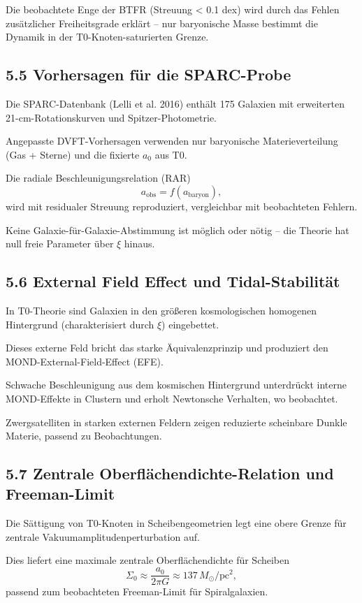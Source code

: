	Die beobachtete Enge der BTFR (Streuung < 0.1 dex) wird durch das Fehlen zusätzlicher Freiheitsgrade erklärt – nur baryonische Masse bestimmt die Dynamik in der T0-Knoten-saturierten Grenze.
	
	\subsection{5.5 Vorhersagen für die SPARC-Probe}
	
	Die SPARC-Datenbank (Lelli et al. 2016) enthält 175 Galaxien mit erweiterten 21-cm-Rotationskurven und Spitzer-Photometrie.
	
	Angepasste DVFT-Vorhersagen verwenden nur baryonische Materieverteilung (Gas + Sterne) und die fixierte $a_0$ aus T0.
	
	Die radiale Beschleunigungsrelation (RAR)
	\[
	a_{\text{obs}} = f(a_{\text{baryon}}),
	\]
	wird mit residualer Streuung reproduziert, vergleichbar mit beobachteten Fehlern.
	
	Keine Galaxie-für-Galaxie-Abstimmung ist möglich oder nötig – die Theorie hat null freie Parameter über $\xi$ hinaus.
	
	\subsection{5.6 External Field Effect und Tidal-Stabilität}
	
	In T0-Theorie sind Galaxien in den größeren kosmologischen homogenen Hintergrund (charakterisiert durch $\xi$) eingebettet.
	
	Dieses externe Feld bricht das starke Äquivalenzprinzip und produziert den MOND-External-Field-Effect (EFE).
	
	Schwache Beschleunigung aus dem kosmischen Hintergrund unterdrückt interne MOND-Effekte in Clustern und erholt Newtonsche Verhalten, wo beobachtet.
	
	Zwergsatelliten in starken externen Feldern zeigen reduzierte scheinbare Dunkle Materie, passend zu Beobachtungen.
	
	\subsection{5.7 Zentrale Oberflächendichte-Relation und Freeman-Limit}
	
	Die Sättigung von T0-Knoten in Scheibengeometrien legt eine obere Grenze für zentrale Vakuumamplitudenperturbation auf.
	
	Dies liefert eine maximale zentrale Oberflächendichte für Scheiben
	\[
	\Sigma_0 \approx \frac{a_0}{2\pi G} \approx 137 \, M_\odot / \text{pc}^2,
	\]
	passend zum beobachteten Freeman-Limit für Spiralgalaxien.
	
